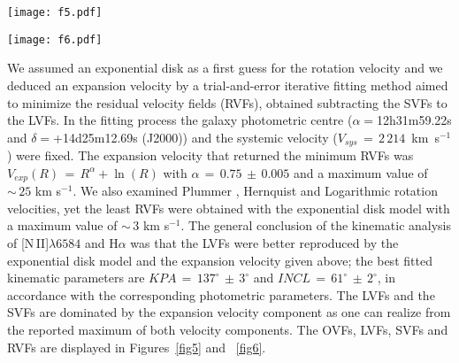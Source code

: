 \documentclass[fleqn,usenatbib]{mnras}
\begin{document}
\begin{figure*}
\texttt{[image: f5.pdf]}
\caption{Top left: observed velocity field of \hbox{[N\,II]$\lambda6584$}. 
Top right: LOESS filtered velocity field of \hbox{[N\,II]$\lambda6584$}. 
Bottom left: synthetic velocity field of \hbox{[N\,II]$\lambda6584$}.
Bottom right: residual velocity field of \hbox{[N\,II]$\lambda6584$}.
The dashed line connects the two points with maximum velocity gradients denoting 
the kinematic position angle of NGC\,4501.}
\label{fig5} 
\end{figure*}

\begin{figure*}
\texttt{[image: f6.pdf]}
\caption{Top left: observed velocity field of H$\alpha$. 
Top right: LOESS filtered velocity field of H$\alpha$. 
Bottom left: synthetic velocity field of H$\alpha$.
Bottom right: residual velocity field of H$\alpha$.
The dashed line connects the two points with maximum velocity gradients denoting
the kinematic position angle of NGC\,4501.}
\label{fig6} 
\end{figure*}

We assumed an exponential disk \citep{Freeman1970} as a first guess for the rotation velocity 
and we deduced an expansion velocity by a trial-and-error iterative fitting method aimed to minimize the residual velocity fields (RVFs), obtained subtracting the SVFs to the LVFs. 
In the fitting process the galaxy photometric centre ($\alpha=$12h31m59.22s and $\delta=$+14d25m12.69s (J2000)) and the systemic velocity \mbox{($V_{sys}\,=\,2\,214$ km s$^{-1}$)} 
were fixed. The expansion velocity that returned the minimum RVFs was \mbox{$V_{exp}(R)\,=\,R^{\alpha}+\ln{(R)}$} with $\alpha\,=\,0.75\,\pm\,0.005$ and a maximum value of $\sim\,25$ 
km s$^{-1}$. We also examined Plummer \citep{Plummer1911}, Hernquist \citep{Hernquist1990} and Logarithmic \citep{Binney1984} rotation velocities, yet the least RVFs were obtained with 
the exponential disk model with a maximum value of $\sim\,3$ km s$^{-1}$. The general conclusion of the kinematic analysis of \hbox{[N\,II]$\lambda6584$} and H$\alpha$ was that the LVFs 
were better reproduced by the exponential disk model and the expansion velocity given above; the best fitted kinematic parameters are $KPA\,=\,137^{\circ}\,\pm\,3^{\circ}$ and 
$INCL\,=\,61^{\circ}\,\pm\,2^{\circ}$, in accordance with the corresponding photometric parameters. The LVFs and the SVFs are dominated by the expansion velocity component as one can 
realize from the reported maximum of both velocity components. The OVFs, LVFs, SVFs and RVFs are displayed in Figures~\ref{fig5} and ~\ref{fig6}. 
\end{document}
